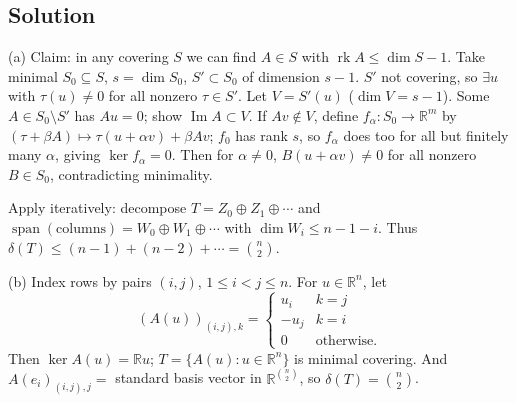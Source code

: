 \documentclass{article}
\begin{document}
\subsection*{Solution}
(a) Claim: in any covering $S$ we can find $A \in S$ with $\operatorname{rk} A \le \dim S - 1$. Take minimal $S_0 \subseteq S$, $s = \dim S_0$, $S' \subset S_0$ of dimension $s - 1$. $S'$ not covering, so $\exists u$ with $\tau(u) \ne 0$ for all nonzero $\tau \in S'$. Let $V = S'(u)$ ($\dim V = s - 1$). Some $A \in S_0 \setminus S'$ has $Au = 0$; show $\operatorname{Im} A \subset V$. If $Av \notin V$, define $f_\alpha : S_0 \to \mathbb{R}^m$ by $(\tau + \beta A) \mapsto \tau(u + \alpha v) + \beta A v$; $f_0$ has rank $s$, so $f_\alpha$ does too for all but finitely many $\alpha$, giving $\ker f_\alpha = 0$. Then for $\alpha \ne 0$, $B(u + \alpha v) \ne 0$ for all nonzero $B \in S_0$, contradicting minimality.

Apply iteratively: decompose $T = Z_0 \oplus Z_1 \oplus \cdots$ and $\operatorname{span}(\text{columns}) = W_0 \oplus W_1 \oplus \cdots$ with $\dim W_i \le n - 1 - i$. Thus $\delta(T) \le (n-1) + (n-2) + \cdots = \binom{n}{2}$.

(b) Index rows by pairs $(i,j)$, $1 \le i < j \le n$. For $u \in \mathbb{R}^n$, let
\[
(A(u))_{(i,j), k} = \begin{cases} u_i & k = j \\ -u_j & k = i \\ 0 & \text{otherwise}. \end{cases}
\]
Then $\ker A(u) = \mathbb{R} u$; $T = \{A(u) : u \in \mathbb{R}^n\}$ is minimal covering. And $A(e_i)_{(i,j), j} = $ standard basis vector in $\mathbb{R}^{\binom{n}{2}}$, so $\delta(T) = \binom{n}{2}$.
\end{document}
